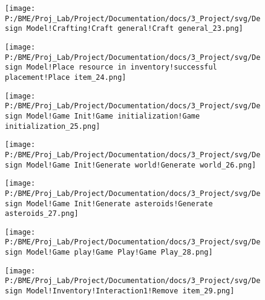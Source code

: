 \begin{figure}[H] 
\centering 
\texttt{[image: P:/BME/Proj\_Lab/Project/Documentation/docs/3\_Project/svg/Design Model!Crafting!Craft general!Craft general\_23.png]} 
\end{figure} 

\begin{figure}[H] 
\centering 
\texttt{[image: P:/BME/Proj\_Lab/Project/Documentation/docs/3\_Project/svg/Design Model!Place resource in inventory!successful placement!Place item\_24.png]} 
\end{figure} 

\begin{figure}[H] 
\centering 
\texttt{[image: P:/BME/Proj\_Lab/Project/Documentation/docs/3\_Project/svg/Design Model!Game Init!Game initialization!Game initialization\_25.png]} 
\end{figure} 

\begin{figure}[H] 
\centering 
\texttt{[image: P:/BME/Proj\_Lab/Project/Documentation/docs/3\_Project/svg/Design Model!Game Init!Generate world!Generate world\_26.png]} 
\end{figure} 

\begin{figure}[H] 
\centering 
\texttt{[image: P:/BME/Proj\_Lab/Project/Documentation/docs/3\_Project/svg/Design Model!Game Init!Generate asteroids!Generate asteroids\_27.png]} 
\end{figure} 

\begin{figure}[H] 
\centering 
\texttt{[image: P:/BME/Proj\_Lab/Project/Documentation/docs/3\_Project/svg/Design Model!Game play!Game Play!Game Play\_28.png]} 
\end{figure} 

\begin{figure}[H] 
\centering 
\texttt{[image: P:/BME/Proj\_Lab/Project/Documentation/docs/3\_Project/svg/Design Model!Inventory!Interaction1!Remove item\_29.png]} 
\end{figure} 


